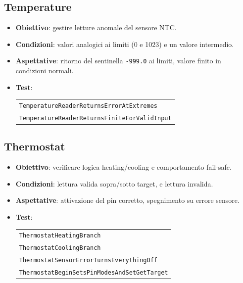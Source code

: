 \subsection{Temperature}
\begin{itemize}
  \item \textbf{Obiettivo}: gestire letture anomale del sensore NTC.
  \item \textbf{Condizioni}: valori analogici ai limiti (0 e 1023) e un valore intermedio.
  \item \textbf{Aspettative}: ritorno del sentinella \texttt{-999.0} ai limiti, valore finito in condizioni normali.
  \item \textbf{Test}:
  \begin{tabular}[t]{@{}l@{}}
    \texttt{TemperatureReaderReturnsErrorAtExtremes}\\
    \texttt{TemperatureReaderReturnsFiniteForValidInput}
  \end{tabular}
\end{itemize}

\subsection{Thermostat}
\begin{itemize}
  \item \textbf{Obiettivo}: verificare logica heating/cooling e comportamento fail-safe.
  \item \textbf{Condizioni}: lettura valida sopra/sotto target, e lettura invalida.
  \item \textbf{Aspettative}: attivazione del pin corretto, spegnimento su errore sensore.
  \item \textbf{Test}:
  \begin{tabular}[t]{@{}l@{}}
    \texttt{ThermostatHeatingBranch}\\
    \texttt{ThermostatCoolingBranch}\\
    \texttt{ThermostatSensorErrorTurnsEverythingOff}\\
    \texttt{ThermostatBeginSetsPinModesAndSetGetTarget}
  \end{tabular}
\end{itemize}

